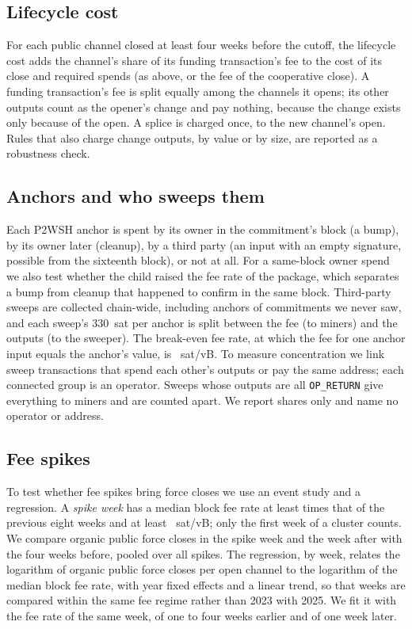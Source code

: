 \subsection{Lifecycle cost}
For each public channel closed at least four weeks before the cutoff, the lifecycle cost adds the channel's share of
its funding transaction's fee to the cost of its close and required spends (as above, or the fee of the cooperative
close). A funding transaction's fee is split equally among the channels it opens; its other outputs count as the
opener's change and pay nothing, because the change exists only because of the open. A splice is charged once, to the
new channel's open. Rules that also charge change outputs, by value or by size, are reported as a robustness check.

\subsection{Anchors and who sweeps them}
Each P2WSH anchor is spent by its owner in the commitment's block (a bump), by its owner later (cleanup), by a third
party (an input with an empty signature, possible from the sixteenth block), or not at all. For a same-block owner
spend we also test whether the child raised the fee rate of the package, which separates a bump from cleanup that
happened to confirm in the same block. Third-party sweeps are collected chain-wide, including anchors of commitments we
never saw, and each sweep's 330~sat per anchor is split between the fee (to miners) and the outputs (to the sweeper).
The break-even fee rate, at which the fee for one anchor input equals the anchor's value, is \BreakEven~sat/vB. To
measure concentration we link sweep transactions that spend each other's outputs or pay the same address; each
connected group is an operator. Sweeps whose outputs are all \texttt{OP\_RETURN} give everything to miners and are
counted apart. We report shares only and name no operator or address.

\subsection{Fee spikes}
\label{sec:spike-method}
To test whether fee spikes bring force closes we use an event study and a regression. A \emph{spike week} has a median
block fee rate at least \SpikeRule{} times that of the previous eight weeks and at least \SpikeMinFee~sat/vB; only the
first week of a cluster counts. We compare organic public force closes in the spike week and the week after with the
four weeks before, pooled over all spikes. The regression, by week, relates the logarithm of organic public force
closes per open channel to the logarithm of the median block fee rate, with year fixed effects and a linear trend, so
that weeks are compared within the same fee regime rather than 2023 with 2025. We fit it with the fee rate of the same
week, of one to four weeks earlier and of one week later.

